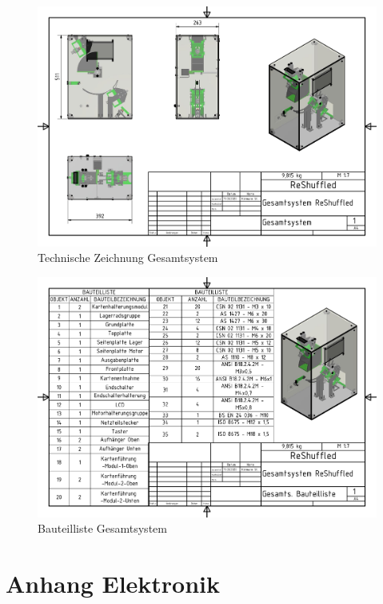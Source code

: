 \begin{figure}
    \centering
    \includegraphics[scale=0.85,page=1]{fig/mech/Gesamtsystem.pdf}
    \caption{Technische Zeichnung Gesamtsystem}
\end{figure}

\begin{figure}
    \centering
    \includegraphics[scale=0.85,page=1,rotate=270]{fig/mech/GesamtsBauteilliste.pdf}
    \caption{Bauteilliste Gesamtsystem}
\end{figure}

\chapter{Anhang Elektronik}

